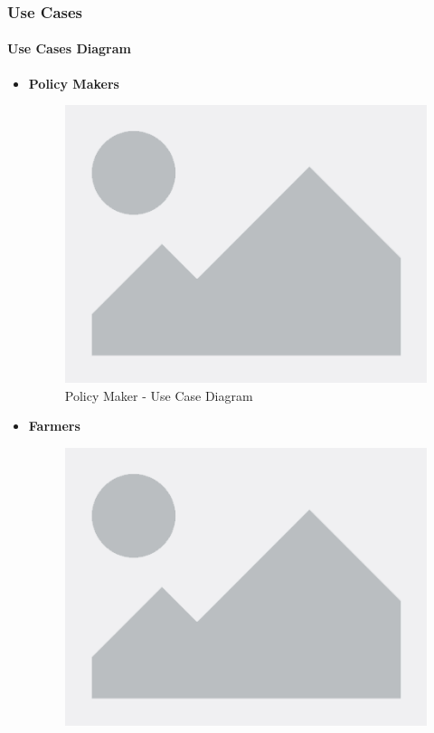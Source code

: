 \documentclass[table, 12pt]{article} %
\begin{document}
    \newpage
    \subsubsection{Use Cases}
    \setcounter{secnumdepth}{4}

      \paragraph{Use Cases Diagram}
    \begin{itemize}
        \item \textbf {Policy Makers}
        \begin{center}
            \begin{figure}[H]
                \includegraphics[scale=0.55, center]{assets/placeholder.png}
                \caption{Policy Maker - Use Case Diagram}
                \label{fig: UseCase_PolicyMaker}
            \end{figure}
        \end{center}
        \newpage
        \item \textbf {Farmers}
        \begin{center}
            \begin{figure}[H]
                \includegraphics[scale=0.60, center]{assets/placeholder.png}

\end{figure}
\end{center}
\end{itemize}
\end{document}

